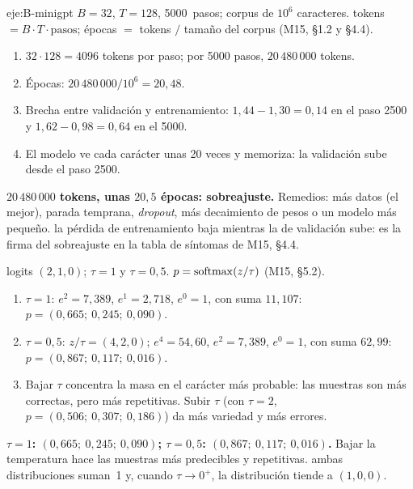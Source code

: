 \begin{solucion}{eje:B-minigpt}
\datos $B=32$, $T=128$, 5000~pasos; corpus de $10^{6}$ caracteres.
\planteamiento tokens $=B\cdot T\cdot\text{pasos}$; épocas $=$ tokens $/$ tamaño del corpus (M15, §1.2 y §4.4).
\pasos
\begin{enumerate}[label=\arabic*.]
  \item $32\cdot 128=4096$ tokens por paso; por 5000 pasos, $20\,480\,000$ tokens.
  \item Épocas: $20\,480\,000/10^{6}=20{,}48$.
  \item Brecha entre validación y entrenamiento: $1{,}44-1{,}30=0{,}14$ en el paso 2500 y $1{,}62-0{,}98=0{,}64$ en el 5000.
  \item El modelo ve cada carácter unas 20 veces y memoriza: la validación sube desde el paso 2500.
\end{enumerate}
\resultado \textbf{$20\,480\,000$ tokens, unas $20{,}5$ épocas: sobreajuste.} Remedios: más datos (el mejor), parada temprana, \emph{dropout}, más decaimiento de pesos o un modelo más pequeño.
\comprobacion la pérdida de entrenamiento baja mientras la de validación sube: es la firma del sobreajuste en la tabla de síntomas de M15, §4.4.

\datos logits $(2,1,0)$; $\tau=1$ y $\tau=0{,}5$.
\planteamiento $p=\operatorname{softmax}(z/\tau)$ (M15, §5.2).
\pasos
\begin{enumerate}[label=\arabic*.]
  \item $\tau=1$: $e^{2}=7{,}389$, $e^{1}=2{,}718$, $e^{0}=1$, con suma $11{,}107$: $p=(0{,}665;\allowbreak\ 0{,}245;\allowbreak\ 0{,}090)$.
  \item $\tau=0{,}5$: $z/\tau=(4,2,0)$; $e^{4}=54{,}60$, $e^{2}=7{,}389$, $e^{0}=1$, con suma $62{,}99$: $p=(0{,}867;\allowbreak\ 0{,}117;\allowbreak\ 0{,}016)$.
  \item Bajar $\tau$ concentra la masa en el carácter más probable: las muestras son más correctas, pero más repetitivas. Subir $\tau$ (con $\tau=2$, $p=(0{,}506;\allowbreak\ 0{,}307;\allowbreak\ 0{,}186)$) da más variedad y más errores.
\end{enumerate}
\resultado \textbf{$\tau=1$: $(0{,}665;\allowbreak\ 0{,}245;\allowbreak\ 0{,}090)$; $\tau=0{,}5$: $(0{,}867;\allowbreak\ 0{,}117;\allowbreak\ 0{,}016)$.} Bajar la temperatura hace las muestras más predecibles y repetitivas.
\comprobacion ambas distribuciones suman~1 y, cuando $\tau\to 0^{+}$, la distribución tiende a $(1,0,0)$.

\end{solucion}
